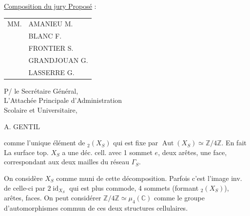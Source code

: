 \uline{Composition du jury Proposé} : \begin{tabular}[t]{ll}
MM. & AMANIEU M.\\
& BLANC F.\\
& FRONTIER S.\\
& GRANDJOUAN G.\\
& LASSERRE G.
\end{tabular}

\begin{flushright}
P/ le Secrétaire Général,\\
L'Attachée Principale d'Administration\\
Scolaire et Universitaire,


A. GENTIL
\end{flushright}


comme l'unique élément de \({}_2(X_S)\) qui est fixe par $\operatorname{Aut}(X_S)\simeq\mathbb Z/4\mathbb Z$. En fait
\inserted{\[
(X_S)^{\unsure{i}}\overset{\unsure{\mathrm{def}}}{\unsure{=}}\{x\in X_S\deleted{\}} \mid ix=x\}=\{e,\eta_S\}
\]}
 La surface top. $X_S$ a une déc. cell.   avec 1 sommet $e$, deux arêtes, une face, correspondant aux deux mailles du réseau $\Gamma_S$.

On considère $X_S$ comme muni de cette décomposition. Parfois c'est l'image inv. de celle-ci par $2\operatorname{id}_{X_S}$ qui est plus commode, 4 sommets (formant \({}_2(X_S)\)),   arêtes,   faces. On peut considérer $\mathbb Z/4\mathbb Z\simeq\mu_4(\mathbb C)$ comme le groupe d'automorphismes commun de ces deux structures cellulaires.


